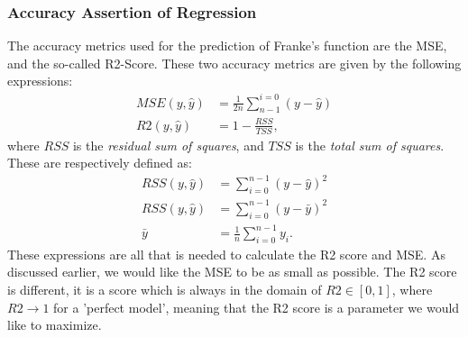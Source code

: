         \subsubsection{Accuracy Assertion of Regression}
        	The accuracy metrics used for the prediction of Franke's function are the MSE,%
        	and the so-called R2-Score. These two accuracy metrics are given by the following expressions:
        	\begin{align}
        		MSE(y, \hat{y}) &= \frac{1}{2n}\sum_{n-1}^{i=0} \left(y-\hat{y}\right)\\
        		R2(y, \hat{y}) &= 1 - \frac{RSS}{TSS},
        	\end{align}
        	where $RSS$ is the \textit{residual sum of squares}, and $TSS$ is the \textit{total sum of squares}. These are respectively defined as:
        	\begin{align}
        		RSS(y, \hat{y}) &= \sum^{n-1}_{i=0} \left(y-\hat{y}\right)^2\\
        		RSS(y, \hat{y}) &= \sum^{n-1}_{i=0} \left(y-\bar{y}\right)^2\\
        		\bar{y} &= \frac{1}{n}\sum^{n-1}_{i=0}y_i. 
        	\end{align}
        	These expressions are all that is needed to calculate the R2 score and MSE. As discussed earlier, we would like the MSE %
        	to be as small as possible. The R2 score is different, it is a score which is always in the domain of $R2\in [0,1]$, where $R2\rightarrow 1$ for a 'perfect model', meaning that the R2 score is a parameter we would like to maximize.